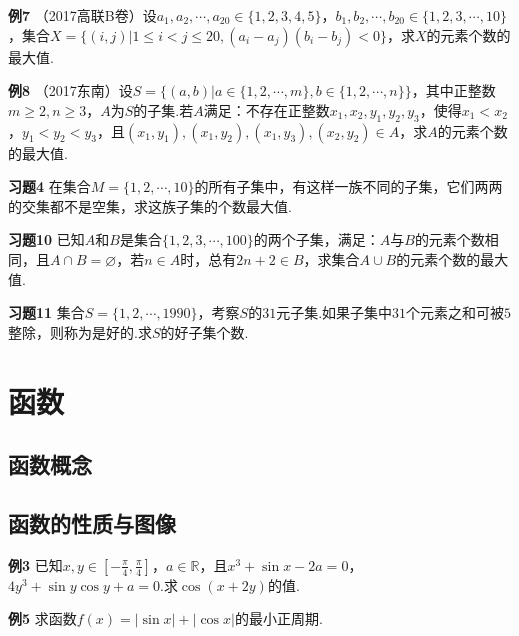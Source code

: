 \documentclass[lang=cn, zihao=4.5]{elegantbook}
\begin{document}
\vspace{30em}
\noindent %
	\textbf{例7} \quad （2017高联B卷）设$a_1,a_2, \cdots ,a_{20} \in \{  1,2,3,4,5  \}$，$b_1,b_2, \cdots ,b_{20} \in \{  1,2,3,\cdots ,10  \}$，集合$X=\{  (i,j)|1 \leq i < j \leq 20 , (a_i-a_j)(b_i-b_j)<0  \}$，求$X$的元素个数的最大值.
	
\newpage
\noindent %
	\textbf{例8} \quad （2017东南）设$S=\{  (a,b)|a \in \{ 1,2,\cdots ,m \},b \in \{ 
1,2, \cdots ,n \}  \}$，其中正整数$m \geq 2,n \geq 3$，$A$为$S$的子集.若$A$满足：不存在正整数$x_1,x_2,y_1,y_2,y_3$，使得$x_1 < x_2$，$y_1 < y_2 < y_3$，且$(x_1,y_1),(x_1,y_2),(x_1,y_3),(x_2,y_2) \in A$，求$A$的元素个数的最大值.

\vspace{30em}
\noindent %
	\textbf{习题4} \quad 在集合$M = \{  1,2,\cdots ,10  \}$的所有子集中，有这样一族不同的子集，它们两两的交集都不是空集，求这族子集的个数最大值.
	
\newpage
\noindent %
	\textbf{习题10} \quad 已知$A$和$B$是集合$\{  1,2,3, \cdots ,100  \}$的两个子集，满足：$A$与$B$的元素个数相同，且$A \cap B = \varnothing$，若$n \in A$时，总有$2n+2 \in B$，求集合$A \cup B$的元素个数的最大值.

\vspace{30em}
\noindent %
	\textbf{习题11} \quad 集合$S=\{  1,2, \cdots ,1990  \}$，考察$S$的$31$元子集.如果子集中$31$个元素之和可被$5$整除，则称为是好的.求$S$的好子集个数.





\chapter{函数}
\section{函数概念}
\section{函数的性质与图像}

\noindent %
	\textbf{例3} \quad 已知$x,y \in \left[ -\frac{\pi}{4},\frac{\pi}{4} \right]$，$a \in \mathbb{R}$，且$x^3+\sin x -2a = 0$，$4y^3 + \sin y \cos y + a=0$.求$\cos (x+2y)$的值.
	
\vspace{30em}
\noindent %
	\textbf{例5} \quad 求函数$f(x)=|\sin x|+|\cos x|$的最小正周期.
	
\end{document}
